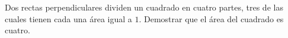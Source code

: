 Dos rectas perpendiculares dividen un cuadrado en cuatro partes, tres de las cuales tienen cada una área igual a $1$. Demostrar que el área del cuadrado es cuatro.